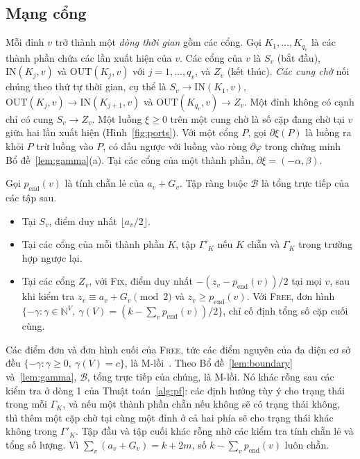 \documentclass[pdflatex,sn-mathphys-num]{sn-jnl}
\theoremstyle{thmstyleone}
\theoremstyle{thmstyletwo}
\theoremstyle{thmstylethree}
\newcommand{\N}{\mathbb{N}}
\newcommand{\cB}{\mathcal{B}}
\newcommand{\IN}{\mathrm{IN}}
\newcommand{\OUT}{\mathrm{OUT}}
\newcommand{\FIX}{\textup{\textsc{Fix}}}
\newcommand{\FREE}{\textup{\textsc{Free}}}
\newcommand{\floor}[1]{\lfloor #1\rfloor}
\begin{document}
\subsection{Mạng cổng}\label{sec:ports}

Mỗi đỉnh $v$ trở thành một \emph{dòng thời gian} gồm các cổng. Gọi $K_1,\dots,K_{q_v}$ là các thành phần chứa các lần xuất hiện của $v$. Các cổng của $v$ là $S_v$ (bắt đầu), $\IN(K_j,v)$ và $\OUT(K_j,v)$ với $j=1,\dots,q_v$, và $Z_v$ (kết thúc). \emph{Các cung chờ} nối chúng theo thứ tự thời gian, cụ thể là $S_v\to\IN(K_1,v)$, $\OUT(K_j,v)\to\IN(K_{j+1},v)$ và $\OUT(K_{q_v},v)\to Z_v$. Một đỉnh không có cạnh chỉ có cung $S_v\to Z_v$. Một luồng $\xi\ge0$ trên một cung chờ là số cặp đang chờ tại $v$ giữa hai lần xuất hiện (Hình~\ref{fig:ports}). Với một cổng $P$, gọi $\partial\xi(P)$ là luồng ra khỏi $P$ trừ luồng vào $P$, có dấu ngược với luồng vào ròng $\partial\varphi$ trong chứng minh Bổ đề~\ref{lem:gamma}(a). Tại các cổng của một thành phần, $\partial\xi=(-\alpha,\beta)$.

Gọi $p_{\mathrm{end}}(v)$ là tính chẵn lẻ của $a_v+G_v$. Tập ràng buộc $\cB$ là tổng trực tiếp của các tập sau.
\begin{itemize}
\item Tại $S_v$, điểm duy nhất $\floor{a_v/2}$.
\item Tại các cổng của mỗi thành phần $K$, tập $\Gamma'_K$ nếu $K$ chẵn và $\Gamma_K$ trong trường hợp ngược lại.
\item Tại các cổng $Z_v$, với \FIX{}, điểm duy nhất $-(z_v-p_{\mathrm{end}}(v))/2$ tại mọi $v$, sau khi kiểm tra $z_v\equiv a_v+G_v \pmod 2$ và $z_v\ge p_{\mathrm{end}}(v)$. Với \FREE{}, đơn hình $\{-\gamma:\gamma\in\N^V,\ \gamma(V)=(k-\sum_vp_{\mathrm{end}}(v))/2\}$, chỉ cố định tổng số cặp cuối cùng.
\end{itemize}
Các điểm đơn và đơn hình cuối của \FREE{}, tức các điểm nguyên của đa diện cơ sở đều $\{-\gamma:\gamma\ge0,\ \gamma(V)=c\}$, là M-lồi~\cite{murota2003}. Theo Bổ đề~\ref{lem:boundary} và~\ref{lem:gamma}, $\cB$, tổng trực tiếp của chúng, là M-lồi. Nó khác rỗng sau các kiểm tra ở dòng 1 của Thuật toán~\ref{alg:pf}: các định hướng tùy ý cho trạng thái trong mỗi $\Gamma_K$, và nếu một thành phần chẵn nếu không sẽ có trạng thái không, thì thêm một cặp chờ tại cùng một đỉnh ở cả hai phía sẽ cho trạng thái khác không trong $\Gamma'_K$. Tập đầu và tập cuối khác rỗng nhờ các kiểm tra tính chẵn lẻ và tổng số lượng. Vì $\sum_v(a_v+G_v)=k+2m$, số $k-\sum_vp_{\mathrm{end}}(v)$ luôn chẵn.
\end{document}
